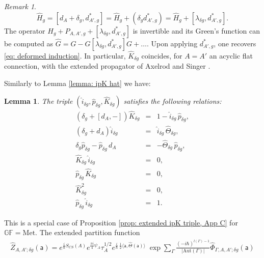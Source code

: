 \documentclass[11pt,a4paper]{amsart}
\theoremstyle{plain} %
\newtheorem{lem}[thm]{Lemma}
\theoremstyle{definition}
\theoremstyle{remark}
\newtheorem{rem}[thm]{Remark}
\newcommand{\mr}{\mathrm}
\newcommand{\sfa}{\mathsf{a}}
\newcommand{\wh}{\widehat}
\begin{document}
{\begin{rem}
\begin{equation}
    \widehat{H}_g = [d_A + \delta_g,d^*_{A',g}] = \wh{H}_g + (\delta_g d_{A',g}^*) = \wh{H}_g + [\lambda_{\delta g}, d^*_{A',g}].
\end{equation}
The operator $H_g + P_{A,A',g} + [\lambda_{\delta g}, d^*_{A',g}]$ is invertible and its Green's function can be computed as
$\wh{G} = G - G[\lambda_{\delta g}, d^*_{A',g}]G + \ldots$. 
Upon applying $d^*_{A',g}$, one recovers \eqref{eq: deformed induction}. In particular, $\wh{K}_{\delta g}$ coincides, for $A = A'$ an acyclic flat connection, with the extended propagator of Axelrod and Singer \cite[Section 4]{Axelrod1994}. 
\end{rem}
Similarly to Lemma \ref{lemma: ipK hat} we have: %
\begin{lem}\label{lem: ipk hat met}
    The triple $(\wh{i}_{\delta g},\wh{p}_{\delta g},\wh{K}_{\delta g})$ satisfies the following relations:
\begin{subequations}
\begin{eqnarray}
    (\delta_{g}+[d_A,-])\wh{K}_{\delta g} &=&1-\wh{i}_{\delta g}\,\wh{p}_{\delta g},  \label{ipK hat a met} \\
    (\delta_{g}+d_A)\wh{i}_{\delta g} &=& \wh{i}_{\delta g}\, \wh\Theta_{\delta g}, \label{ipK hat b met}\\
    \delta_{g} \wh{p}_{\delta g} - \wh{p}_{\delta g} \, d_A &=&  -\wh\Theta_{\delta g}\, \wh{p}_{\delta g}, \label{ipK hat c met}\\
    \wh{K}_{\delta g}\, \wh{i}_{\delta g} &=& 0,\label{ipK hat d met}\\
    \wh{p}_{\delta g}\, \wh{K}_{\delta g} &=& 0, \label{ipK hat e met}\\
    \wh{K}_{\delta g}^2 &=& 0, \label{ipK hat f met}\\
    \wh{p}_{\delta g} \,\wh{i}_{\delta g} &=& 1. \label{ipk hat pi=1 met}
\end{eqnarray}
\end{subequations}
\end{lem}
This is a special case of Proposition \ref{prop: extended ipK triple, App C} for $\mathbb{GF}=\mr{Met}$.
The extended partition function 
\begin{multline}\label{Zhat g}
    \wh{Z}_{A,A';\delta g}(\sfa) 
    =e^{\frac{i}{\hbar}S_{CS}(A)} 
    e^{\frac{\pi i}{4}\psi_A}\tau_{A}^{1/2}
e^{\frac{i}{\hbar}\,\frac12\langle \sfa, \wh\Theta(\sfa)\rangle}\;\exp \sum_\Gamma \frac{(-i\hbar)^{l(\Gamma)-1}}{|\mr{Aut}(\Gamma)|}\wh{\Phi}_{\Gamma,A,A';\delta g}(\sfa)\\ 

\end{multline}}
\end{document}
